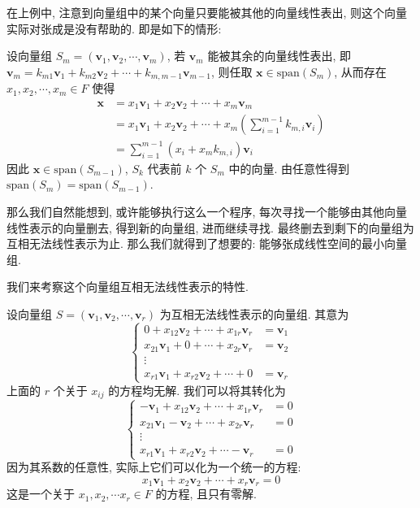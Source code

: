 \documentclass[UTF8]{book}
\begin{document}
在上例中, 注意到向量组中的某个向量只要能被其他的向量线性表出, 
则这个向量实际对张成是没有帮助的. 
即是如下的情形: 

设向量组 $S_m=(\boldsymbol{v}_1,\boldsymbol{v}_2,\cdots,\boldsymbol{v}_m)$, 
若 $\boldsymbol{v}_m$ 能被其余的向量线性表出, 即 
$\boldsymbol{v}_m = k_{m1}\boldsymbol{v}_1+k_{m2}\boldsymbol{v}_2+ 
\cdots + k_{m,m-1}\boldsymbol{v}_{m-1}$, 
则任取 $\boldsymbol{x} \in \mathrm{span}(S_m)$, 
从而存在 $x_1,x_2,\cdots,x_m \in F$ 使得 
$$\begin{aligned}
\boldsymbol{x} &= x_1 \boldsymbol{v}_1 + x_2 \boldsymbol{v}_2 + 
\cdots + x_m\boldsymbol{v}_m \\
&= x_1 \boldsymbol{v}_1 + x_2 \boldsymbol{v}_2 + 
\cdots + x_m\left(\sum_{i=1}^{m-1}k_{m,i}\boldsymbol{v}_i\right)\\
&=\sum_{i=1}^{m-1}( x_i + x_mk_{m,i})\boldsymbol{v}_i
\end{aligned}$$
因此 $\boldsymbol{x} \in \mathrm{span}(S_{m-1})$, 
$S_k$ 代表前 $k$ 个 $S_m$ 中的向量. 
由任意性得到 $\mathrm{span}(S_m) = \mathrm{span}(S_{m-1})$. 

那么我们自然能想到, 或许能够执行这么一个程序, 
每次寻找一个能够由其他向量线性表示的向量删去, 得到新的向量组, 
进而继续寻找. 最终删去到剩下的向量组为互相无法线性表示为止. 
那么我们就得到了想要的: 能够张成线性空间的最小向量组. 

我们来考察这个向量组互相无法线性表示的特性. 

设向量组 $S=(\boldsymbol{v}_1,\boldsymbol{v}_2,\cdots,\boldsymbol{v}_r)$ 
为互相无法线性表示的向量组. 其意为
\begin{equation}
    \begin{cases}
        0 + x_{12}\boldsymbol{v}_2 + \cdots + x_{1r}\boldsymbol{v}_r
        &= \boldsymbol{v}_1 \\
        x_{21}\boldsymbol{v}_1 + 0 + \cdots + x_{2r}\boldsymbol{v}_r 
        &= \boldsymbol{v}_2 \\
        \vdots  &\\
        x_{r1}\boldsymbol{v}_1 +x_{r2}\boldsymbol{v}_2 + \cdots 
        + 0 &= \boldsymbol{v}_r 
    \end{cases}
\end{equation}
上面的 $r$ 个关于 $x_{ij}$ 的方程均无解. 
我们可以将其转化为 
\begin{equation}
    \begin{cases}
        -\boldsymbol{v}_1 + x_{12}\boldsymbol{v}_2 + \cdots + x_{1r}\boldsymbol{v}_r
        &= 0  \\
        x_{21}\boldsymbol{v}_1 -\boldsymbol{v}_2 + \cdots + x_{2r}\boldsymbol{v}_r 
        &= 0 \\
        \vdots  &\\
        x_{r1}\boldsymbol{v}_1 +x_{r2}\boldsymbol{v}_2 + \cdots 
        -\boldsymbol{v}_r &= 0 
    \end{cases}
\end{equation}
因为其系数的任意性, 实际上它们可以化为一个统一的方程: 
\begin{equation} \label{eq vector formula}
    x_1\boldsymbol{v}_1 + x_{2}\boldsymbol{v}_2 + \cdots + 
    x_{r}\boldsymbol{v}_r= 0
\end{equation}
这是一个关于 $x_1,x_2,\cdots x_r \in F$ 的方程, 
且只有零解. 
\end{document}
